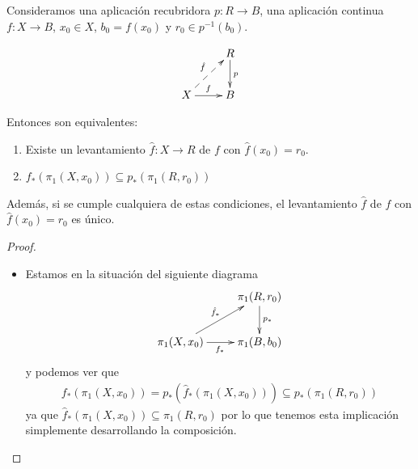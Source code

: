 \begin{teo}
    Consideramos una aplicación recubridora $p:R\to B$, una aplicación continua $f:X\to B$, $x_0\in X$, $b_0=f(x_0)$ y $r_0\in p^{-1}(b_0)$. 
    
    \begin{gather*}
        \xymatrix{
            & R \ar[d]^p\\
            X \ar[r]^{f} \ar@{-->}[ur]^{\hat{f}} & B
        }
    \end{gather*}

    Entonces son equivalentes:
    \begin{enumerate}
        \item Existe un levantamiento $\hat{f}:X \to R$ de $f$ con $\hat{f}(x_0)=r_0$.
        \item $f_*(\pi_1(X,x_0))\subseteq p_*(\pi_1(R,r_0))$
    \end{enumerate}
    Además, si se cumple cualquiera de estas condiciones, el levantamiento $\hat{f}$ de $f$ con $\hat{f}(x_0)=r_0$ es único.

    \begin{proof}\
        \begin{itemize}
            \item [(1) $\Rightarrow$ (2)] Estamos en la situación del siguiente diagrama
            \begin{gather*}
                \xymatrix{
                    & \pi_1(R,r_0) \ar[d]^{p_*}\\
                    \pi_1(X,x_0) \ar[ur]^{\hat{f}_*} \ar[r]_{f_*} & \pi_1(B,b_0)
                }
            \end{gather*}
            y podemos ver que 
            \begin{gather*}
                f_*(\pi_1(X,x_0)) = p_*(\hat{f}_*(\pi_1(X,x_0))) \subseteq p_*(\pi_1(R,r_0))
            \end{gather*}
            ya que $\hat{f}_*(\pi_1(X,x_0))\subseteq \pi_1(R,r_0)$ por lo que tenemos esta implicación simplemente desarrollando la composición.


\end{itemize}
\end{proof}
\end{teo}
